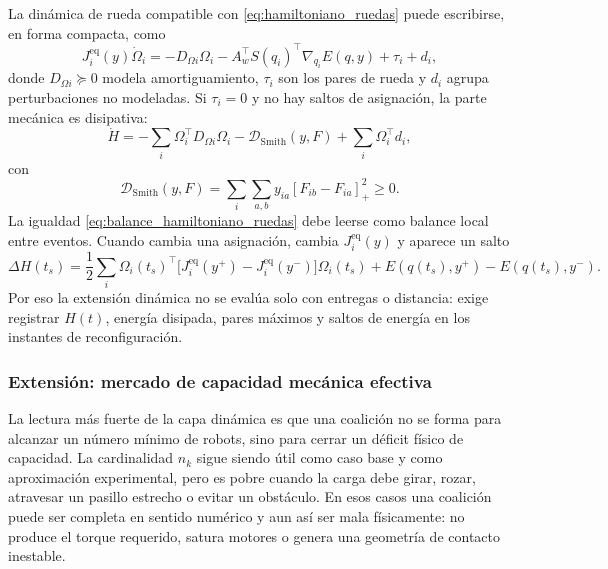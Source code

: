 

La dinámica de rueda compatible con \eqref{eq:hamiltoniano_ruedas} puede escribirse, en
forma compacta, como
\begin{equation}
  J_i^{\mathrm{eq}}(y)\dot\Omega_i
  =
  -D_{\Omega i}\Omega_i
  -A_w^\top S(q_i)^\top\nabla_{q_i}E(q,y)
  +\tau_i+d_i,
  \label{eq:dinamica_ruedas_hamiltoniana}
\end{equation}
donde $D_{\Omega i}\succeq 0$ modela amortiguamiento, $\tau_i$ son los pares de rueda y
$d_i$ agrupa perturbaciones no modeladas. Si $\tau_i=0$ y no hay saltos de asignación,
la parte mecánica es disipativa:
\begin{equation}
  \dot H
  =
  -\sum_i \Omega_i^\top D_{\Omega i}\Omega_i
  -\mathcal{D}_{\mathrm{Smith}}(y,F)
  +\sum_i \Omega_i^\top d_i ,
  \label{eq:balance_hamiltoniano_ruedas}
\end{equation}
con
\[
  \mathcal{D}_{\mathrm{Smith}}(y,F)
  =
  \sum_i\sum_{a,b} y_{ia}[F_{ib}-F_{ia}]_+^2 \geq 0 .
\]
La igualdad \eqref{eq:balance_hamiltoniano_ruedas} debe leerse como balance local entre
eventos. Cuando cambia una asignación, cambia $J_i^{\mathrm{eq}}(y)$ y aparece un salto
\begin{equation}
  \Delta H(t_s)=
  \frac{1}{2}\sum_i
  \Omega_i(t_s)^\top
  \bigl[J_i^{\mathrm{eq}}(y^+)-J_i^{\mathrm{eq}}(y^-)\bigr]
  \Omega_i(t_s)
  +E(q(t_s),y^+)-E(q(t_s),y^-).
  \label{eq:salto_hamiltoniano}
\end{equation}
Por eso la extensión dinámica no se evalúa solo con entregas o distancia: exige registrar
$H(t)$, energía disipada, pares máximos y saltos de energía en los instantes de
reconfiguración.



\subsubsection{Extensión: mercado de capacidad mecánica efectiva}
\label{subsubsec:capacidad_efectiva}

La lectura más fuerte de la capa dinámica es que una coalición no se forma para alcanzar
un número mínimo de robots, sino para cerrar un déficit físico de capacidad. La
cardinalidad $n_k$ sigue siendo útil como caso base y como aproximación experimental,
pero es pobre cuando la carga debe girar, rozar, atravesar un pasillo estrecho o evitar
un obstáculo. En esos casos una coalición puede ser completa en sentido numérico y aun
así ser mala físicamente: no produce el torque requerido, satura motores o genera una
geometría de contacto inestable.

